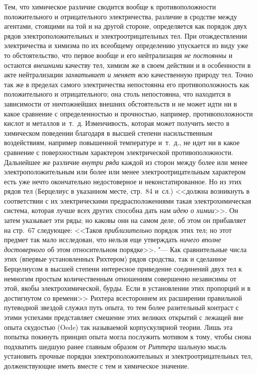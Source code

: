Тем, что химическое различие сводится вообще к противоположности
положительного и отрицательного электричества, различие в сродстве между
агентами, стоящими на той и на другой стороне, определяется как порядок
двух рядов электроположительных и электроотрицательных тел. При
отождествлении электричества и химизма по их всеобщему определению
упускается из виду уже то обстоятельство, что первое вообще и его
нейтрализация {\em не постоянны} и остаются
{\em внешними} качеству тел, химизм же в своем действии
и в особенности в акте нейтрализации {\em захватывает и
меняет всю} качественную природу тел. Точно так же в пределах самого
электричества непостоянна его противоположность как положительного и
отрицательного; она столь непостоянна, что находится в зависимости от
ничтожнейших внешних обстоятельств и не может идти ни в какое сравнение с
определенностью и прочностью, например, противоположности кислот и металлов
и~т.~д. Изменчивость, которая может получить место в химическом поведении
благодаря в высшей степени насильственным воздействиям, например повышенной
температуре и~т.~д., не идет ни в какое сравнение с поверхностным
характером электрической противоположности. Дальнейшее же различие
{\em внутри ряда} каждой из сторон между более или
менее электроположительным или более или менее электроотрицательным
характером есть уже нечто окончательно недостоверное и неконстатированное.
Но из этих рядов тел (Берцелиус в указанном месте, стр.~84 и~сл.) <<должна
возникнуть в соответствии с их электрическими предрасположениями такая
электрохимическая система, которая лучше всех других способна дать нам
{\em идею о химии}>>. Он затем указывает эти ряды; но
каковы они на самом деле, об этом он прибавляет на стр.~67 следующее:
<<Таков {\em приблизительно} порядок этих тел; но этот
предмет так мало исследован, что нельзя еще утверждать
{\em ничего вполне достоверного} об этом относительном
порядке>>. "--- Как сравнительные числа этих (впервые установленных Рихтером)
рядов сродства, так и сделанное Берцелиусом в высшей степени интересное
приведение соединений двух тел к немногим простым количественным отношениям
совершенно независимы от этой, якобы электрохимической, бурды. Если в
установлении этих пропорций и в достигнутом со времени>> Рихтера
всестороннем их расширении правильной путеводной звездой служил путь опыта,
то тем более разительный контраст с этими успехами представляет смешение
этих великих открытий с лежащей вне опыта скудостью (Oede) так называемой
корпускулярной теории. Лишь эта попытка покинуть принцип опыта могла
послужить мотивом к тому, чтобы снова подхватить шедшую ранее главным
образом от {\em Риттера} шальную мысль установить
прочные порядки электроположительных и электроотрицательных тел,
долженствующие иметь вместе с тем и химическое значение.

